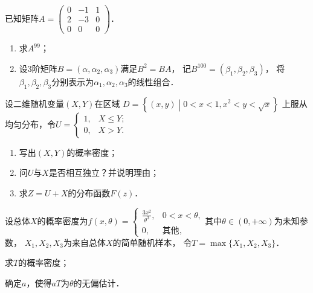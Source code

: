 \documentclass[plain,noanswer,medmath]{../../template/jnuexam}
\begin{document}
\begin{problem}[points=11]
已知矩阵$A = \begin{pmatrix}
  0 & -1 & 1 \\
  2 & -3 & 0 \\
  0 &  0 & 0
\end{pmatrix}$．
\begin{enumerate}
\item 求$A^{99}$；
\item 设$3$阶矩阵$B = (\alpha ,\alpha_2,\alpha_3)$满足$B^2 = BA$，
      记$B^{100} = (\beta_1,\beta_2,\beta_3)$，
      将$\beta_1,\beta_2,\beta_3$分别表示为$\alpha_1,\alpha_2,\alpha_3$的线性组合．
\end{enumerate}
\end{problem}


\begin{problem}[points=11]
设二维随机变量$(X,Y)$在区域
$D = \left\{(x,y) \middle| 0 < x < 1, x^2 < y < \sqrt{x} \right\}$
上服从均匀分布，令$U = \begin{cases}
  1, & X \le Y; \\
  0, & X > Y.
\end{cases}$
\begin{enumerate}
\item 写出$(X,Y)$的概率密度；
\item 问$U$与$X$是否相互独立？并说明理由；
\item 求$Z = U + X$的分布函数$F(z)$．
\end{enumerate}
\end{problem}


\begin{problem}[points=11]
设总体$X$的概率密度为$f(x,\theta) = \begin{cases}
  \frac{3x^2}{\theta^3}, & 0 < x < \theta, \\
  0,                     & \text{其他},
\end{cases}$其中$\theta \in (0,+\infty)$为未知参数，
${X_1},{X_2},{X_3}$为来自总体$X$的简单随机样本，
令$T = \max\{X_1,X_2,X_3\}$．\par
\begin{enumerate*}
\item 求$T$的概率密度；
\item 确定$a$，使得$aT$为$\theta $的无偏估计．
\end{enumerate*}
\end{problem}
\end{document}
